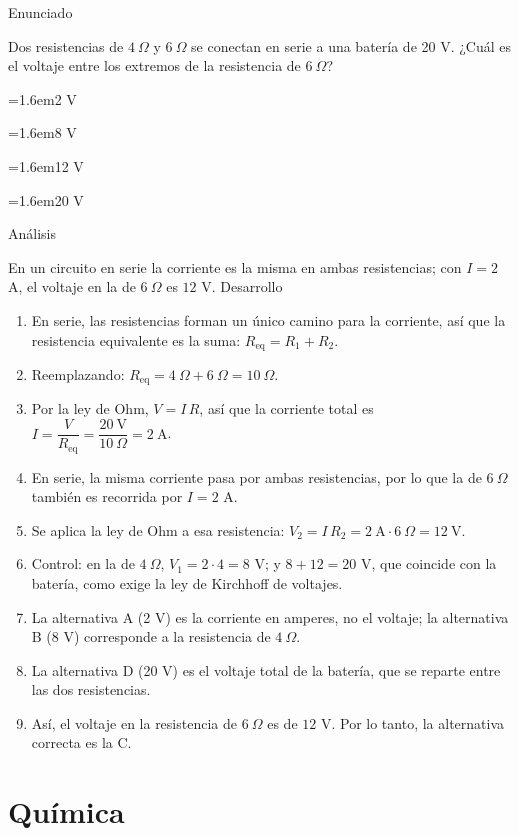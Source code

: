 \documentclass[10pt,a4paper,twocolumn]{article}
\newcommand{\alternativa}[2]{\par\noindent\hangindent=1.6em\hangafter=1\makebox[1.6em][l]{\tecla{#1}}#2\par}
\newcommand{\clave}[1]{\par\smallskip{\sffamily\footnotesize\color{esmeralda} Clave \teclaok{#1}}\par}
\begin{document}
\begin{ejemplo}
{\sffamily\footnotesize\color{zinc500} Enunciado}\par
Dos resistencias de $4\ \Omega$ y $6\ \Omega$ se conectan en serie a una batería de 20 V. ¿Cuál es el voltaje entre los extremos de la resistencia de $6\ \Omega$?
\alternativa{A}{2 V}
\alternativa{B}{8 V}
\alternativa{C}{12 V}
\alternativa{D}{20 V}
\clave{C}
{\sffamily\footnotesize\color{zinc500} Análisis}\par En un circuito en serie la corriente es la misma en ambas resistencias; con $I = 2$ A, el voltaje en la de $6\ \Omega$ es $12$ V.
{\sffamily\footnotesize\color{zinc500} Desarrollo}
\begin{enumerate}
  \item En serie, las resistencias forman un único camino para la corriente, así que la resistencia equivalente es la suma: $R_{\text{eq}} = R_1 + R_2$.
  \item Reemplazando: $R_{\text{eq}} = 4\ \Omega + 6\ \Omega = 10\ \Omega$.
  \item Por la ley de Ohm, $V = I\,R$, así que la corriente total es $I = \dfrac{V}{R_{\text{eq}}} = \dfrac{20\ \mathrm{V}}{10\ \Omega} = 2\ \mathrm{A}$.
  \item En serie, la misma corriente pasa por ambas resistencias, por lo que la de $6\ \Omega$ también es recorrida por $I = 2$ A.
  \item Se aplica la ley de Ohm a esa resistencia: $V_2 = I\,R_2 = 2\ \mathrm{A}\cdot 6\ \Omega = 12\ \mathrm{V}$.
  \item Control: en la de $4\ \Omega$, $V_1 = 2\cdot 4 = 8$ V; y $8 + 12 = 20$ V, que coincide con la batería, como exige la ley de Kirchhoff de voltajes.
  \item La alternativa A (2 V) es la corriente en amperes, no el voltaje; la alternativa B (8 V) corresponde a la resistencia de $4\ \Omega$.
  \item La alternativa D (20 V) es el voltaje total de la batería, que se reparte entre las dos resistencias.
  \item Así, el voltaje en la resistencia de $6\ \Omega$ es de $12$ V. Por lo tanto, la alternativa correcta es la C.
\end{enumerate}
\end{ejemplo}

\section{Química}
\end{document}

